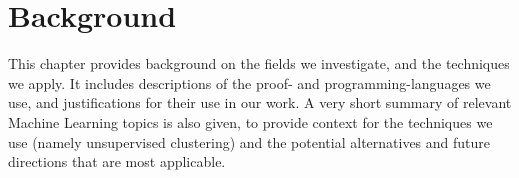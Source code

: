 \chapter{Background}


This chapter provides background on the fields we investigate, and the
techniques we apply. It includes descriptions of the proof- and
programming-languages we use, and justifications for their use in our work. A
very short summary of relevant Machine Learning topics is also given, to provide
context for the techniques we use (namely unsupervised clustering) and the
potential alternatives and future directions that are most applicable.





% 


